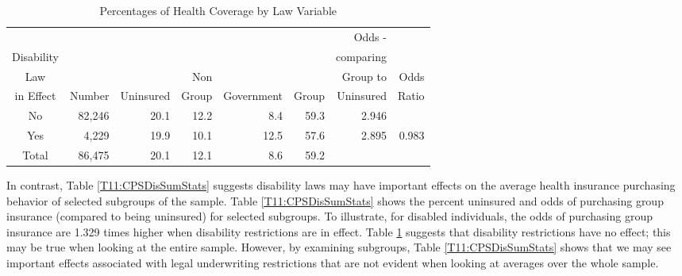   \begin{center}  \begin{table}[h]
\caption{\label{T11:CPSSummaryStats} Percentages of Health Coverage
by Law Variable}
\begin{tabular}{crrrrrrr}
\hline
               &      &         &      &          &       & Odds -    & \\
Disability     &      &         &      &          &       & comparing & \\
Law            &      &         & Non  &          &       & Group to  & Odds \\
in Effect      &Number&Uninsured&Group &Government& Group & Uninsured & Ratio \\
\hline
No & 82,246 & 20.1 & 12.2 & 8.4 & 59.3 & 2.946 & \\
Yes & 4,229 & 19.9 & 10.1 & 12.5 & 57.6 & 2.895 & 0.983 \\
\hline
Total & 86,475 & 20.1 & 12.1 & 8.6 & 59.2 & & \\
\hline
\end{tabular}
\end{table}  \end{center}  
\bigskip

In contrast, Table \ref{T11:CPSDisSumStats} suggests disability laws
may have important effects on the average health insurance
purchasing behavior of selected subgroups of the sample. Table
\ref{T11:CPSDisSumStats} shows the percent uninsured and odds of
purchasing group insurance (compared to being uninsured) for
selected subgroups. To illustrate, for disabled individuals, the
odds of purchasing group insurance are 1.329 times higher when
disability restrictions are in effect. Table
\ref{T11:CPSSummaryStats} suggests that disability restrictions have
no effect; this may be true when looking at the entire sample.
However, by examining subgroups, Table \ref{T11:CPSDisSumStats}
shows that we may see important effects associated with legal
underwriting restrictions that are not evident when looking at
averages over the whole sample.


